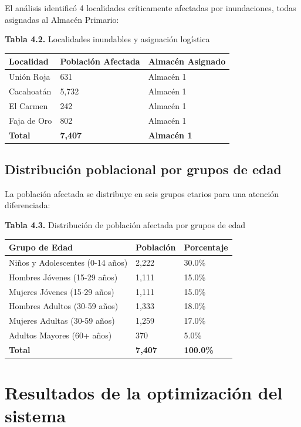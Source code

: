 \documentclass[
  spanish,
  us-letterpaper,
]{scrreprt}
\numberwithin{equation}{chapter} %
\begin{document}
El análisis identificó 4 localidades críticamente afectadas por
inundaciones, todas asignadas al Almacén Primario:

\textbf{Tabla 4.2.} Localidades inundables y asignación logística

\begin{longtable}[]{@{}lll@{}}
\toprule\noalign{}
Localidad & Población Afectada & Almacén Asignado \\
\midrule\noalign{}
\endhead
\bottomrule\noalign{}
\endlastfoot
Unión Roja & 631 & Almacén 1 \\
Cacahoatán & 5,732 & Almacén 1 \\
El Carmen & 242 & Almacén 1 \\
Faja de Oro & 802 & Almacén 1 \\
\textbf{Total} & \textbf{7,407} & \textbf{Almacén 1} \\
\end{longtable}

\subsection{Distribución poblacional por grupos de
edad}\label{distribuciuxf3n-poblacional-por-grupos-de-edad}

La población afectada se distribuye en seis grupos etarios para una
atención diferenciada:

\textbf{Tabla 4.3.} Distribución de población afectada por grupos de
edad

\begin{longtable}[]{@{}lll@{}}
\toprule\noalign{}
Grupo de Edad & Población & Porcentaje \\
\midrule\noalign{}
\endhead
\bottomrule\noalign{}
\endlastfoot
Niños y Adolescentes (0-14 años) & 2,222 & 30.0\% \\
Hombres Jóvenes (15-29 años) & 1,111 & 15.0\% \\
Mujeres Jóvenes (15-29 años) & 1,111 & 15.0\% \\
Hombres Adultos (30-59 años) & 1,333 & 18.0\% \\
Mujeres Adultas (30-59 años) & 1,259 & 17.0\% \\
Adultos Mayores (60+ años) & 370 & 5.0\% \\
\textbf{Total} & \textbf{7,407} & \textbf{100.0\%} \\
\end{longtable}

\section{Resultados de la optimización del
sistema}\label{resultados-de-la-optimizaciuxf3n-del-sistema}
\end{document}
